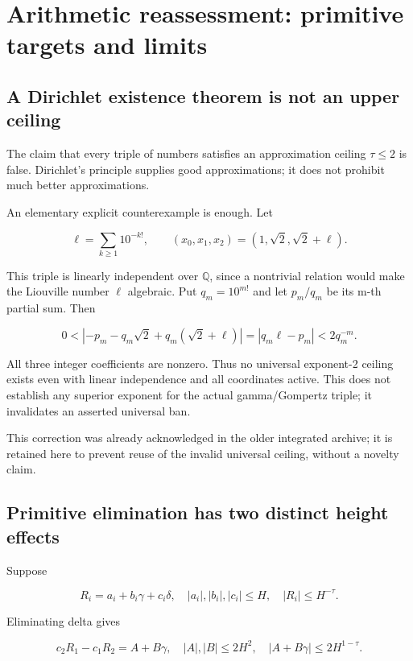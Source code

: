 \documentclass[11pt,a4paper]{article}
\theoremstyle{definition}
\theoremstyle{remark}
\theoremstyle{plain}
\numberwithin{equation}{section}
\begin{document}
\section{Arithmetic reassessment: primitive targets and limits}\label{sc:au:arithmetic-reassessment-primitive-targets-and-scoped-obstructions}

\subsection{A Dirichlet existence theorem is not an upper
ceiling}\label{sc:au:a-dirichlet-existence-theorem-is-not-an-upper-ceiling}

The claim that every triple of numbers satisfies an approximation
ceiling \(\tau\le2\) is false. Dirichlet's principle supplies good
approximations; it does not prohibit much better approximations.

An elementary explicit counterexample is enough. Let

\[
\ell=\sum_{k\ge1}10^{-k!},\qquad
(x_0,x_1,x_2)=(1,\sqrt2,\sqrt2+\ell).
\]

This triple is linearly independent over $\mathbb Q$, since a nontrivial relation
would make the Liouville number $\ell$ algebraic. Put \(q_m=10^{m!}\) and
let \(p_m/q_m\) be its m-th partial sum. Then

\[
0<|-p_m-q_m\sqrt2+q_m(\sqrt2+\ell)|
=|q_m\ell-p_m|<2q_m^{-m}.
\]

All three integer coefficients are nonzero. Thus no universal exponent-2
ceiling exists even with linear independence and all coordinates active.
This does not establish any superior exponent for the actual
gamma/Gompertz triple; it invalidates an asserted universal ban.

This correction was already acknowledged in the older integrated
archive; it is retained here to prevent reuse of the invalid universal
ceiling, without a novelty claim.

\subsection{Primitive elimination has two distinct height
effects}\label{sc:au:primitive-elimination-has-two-distinct-height-effects}

Suppose

\[
R_i=a_i+b_i\gamma+c_i\delta,\quad
|a_i|,|b_i|,|c_i|\le H,\quad |R_i|\le H^{-\tau}.
\]

Eliminating delta gives

\[
c_2R_1-c_1R_2=A+B\gamma,
\quad |A|,|B|\le2H^2,
\quad |A+B\gamma|\le2H^{1-\tau}.
\]
\end{document}
